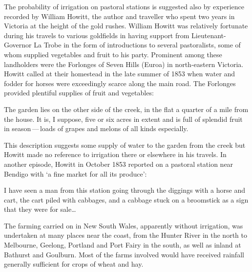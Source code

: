 The probability of irrigation on pastoral stations is suggested also
by experience recorded by William Howitt, the author and traveller who
spent two years in Victoria at the height of the gold rushes.  William
Howitt  was relatively fortunate during his
travels to various goldfields in having support from
Lieutenant-Governor La Trobe  in the form
of introductions to several pastoralists, some of whom supplied
vegetables and fruit to his party.  Prominent among these landholders
were the Forlonges
 of
Seven Hills  (Euroa)  in
north-eastern Victoria.  Howitt called at their homestead in the late
summer of 1853 when water and fodder for horses were exceedingly
scarce along the main road.  The Forlonges provided plentiful supplies
of fruit and vegetables:
\begin{Quote}
	The garden lies on the other side of the creek, in the flat a
	quarter of a mile from the house. It is, I suppose, five or
	six acres in extent and is full of splendid fruit in
	season\,---\,loads of grapes and melons of all kinds
	especially.
\end{Quote}

This description suggests some supply of water to the garden from the
creek but Howitt made no reference to irrigation there or elsewhere in
his travels.  In another episode, Howitt in October 1853 reported on a
pastoral station near Bendigo with `a fine market for all its
produce':
\begin{Quote}
	I have seen a man from this station going through the diggings
	with a horse and cart, the cart piled with cabbages, and a
	cabbage stuck on a broomstick as a sign that they were for
	sale\ldots{}
\end{Quote}

The farming carried on in New South Wales, apparently without
irrigation, was undertaken at many places near the coast, from the
Hunter River  in the north to Melbourne,
 Geelong,  
Portland  and Port Fairy
 in the south, as well as inland at Bathurst
 and
Goulburn.  Most of the farms involved would have
received rainfall generally sufficient for crops of wheat and hay.

